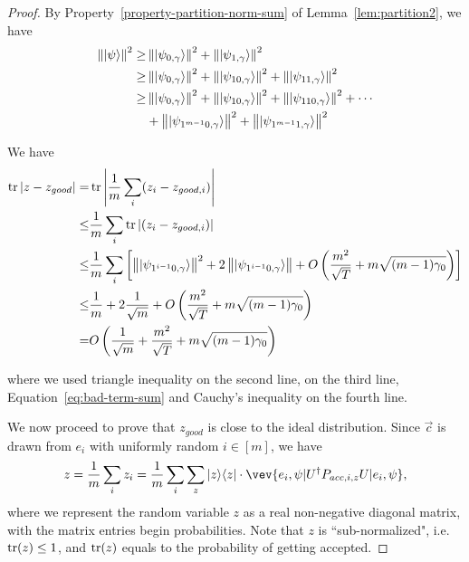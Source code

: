\begin{theorem}
\end{theorem}
\begin{proof}

	By Property~\ref{property-partition-norm-sum} of Lemma~\ref{lem:partition2}, we have
	\begin{align} \label{eq:bad-term-sum}
		\left\lVert\ket{\psi}\right\rVert^2 \geq& \left\lVert\ket{\psi_{0,\gamma}}\right\rVert^2+\left\lVert\ket{\psi_{1,\gamma}}\right\rVert^2 \nonumber \\
		\geq& \left\lVert\ket{\psi_{0,\gamma}}\right\rVert^2+
		\left\lVert\ket{\psi_{10,\gamma}}\right\rVert^2+ \left\lVert\ket{\psi_{11,\gamma}}\right\rVert^2 \nonumber \\
		\geq& \left\lVert\ket{\psi_{0,\gamma}}\right\rVert^2+
		\left\lVert\ket{\psi_{10,\gamma}}\right\rVert^2+ \left\lVert\ket{\psi_{110,\gamma}}\right\rVert^2 +\cdots  \nonumber \\
		&+ \left\lVert\ket{\psi_{1^{m-1}0,\gamma}}\right\rVert^2+ \left\lVert\ket{\psi_{1^{m-1}1,\gamma}}\right\rVert^2
	\end{align}

	We have
	\begin{align} \label{eq:z-z-good}
		\tr|z-z_{good}| =& \tr\L|\frac{1}{m}\sum_i (z_i-z_{good,i})\R| \nn \\
		\leq&  \frac{1}{m}\sum_i\tr| (z_i-z_{good,i})| \nn \\
		\leq&  \frac{1}{m}\sum_i\L[\norm{\ket{\psi_{1^{i-1}0,\gamma}}}^2+ 2\norm{\ket{\psi_{1^{i-1}0,\gamma}}}+O\L(\frac{m^2}{\sqrt T}+m\sqrt{(m-1)\gamma_0}\R)\R] \nn \\%
		\leq&  \frac{1}{m}+ 2\frac{1}{\sqrt m}+O\L(\frac{m^2}{\sqrt T}+m\sqrt{(m-1)\gamma_0}\R) \nn \\ %
		=&O\L( \frac{1}{\sqrt m}+\frac{m^2}{\sqrt T}+m\sqrt{(m-1)\gamma_0}\R)
	\end{align}

	where we used triangle inequality on the second line,  on the third line, Equation~\ref{eq:bad-term-sum} and Cauchy's inequality on the fourth line.

	We now proceed to prove that $z_{good}$ is close to the ideal distribution.
	Since $\vec{c}$ is drawn  from $e_i$ with uniformly random $i\in [m]$, we have
	$$z=\frac{1}{m} \sum_i z_i= \frac{1}{m} \sum_i \sum_z \proj{z} \cdot \vev{e_i,\psi|U^\dag P_{acc,i,z} U|e_i,\psi},$$
	where we represent the random variable $z$ as a real non-negative diagonal matrix, with the matrix entries begin  probabilities. Note that $z$ is ``sub-normalized", i.e. $\operatorname{tr} (z) \leq 1 \text{}$, and $\operatorname{tr}(z)$ equals to the probability of getting accepted.


\end{proof}
